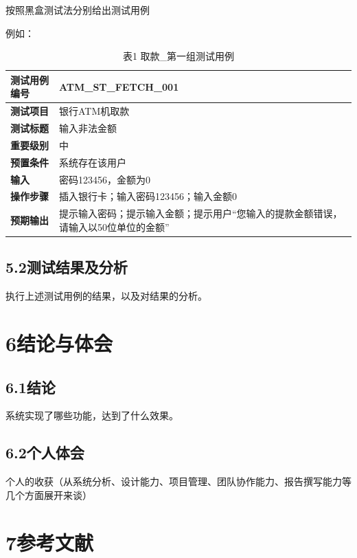 \documentclass[12pt,a4paper,oneside]{ctexart}
\begin{document}
\par 按照黑盒测试法分别给出测试用例
\par 例如：
\begin{table}[htbp]
\centering
\caption{表1 取款\_第一组测试用例}
\label{表1取款_第一组测}
\begin{tabular}{|p{3cm}|p{8cm}|}
\hline
  \textbf{测试用例编号} & ATM\_ST\_FETCH\_001 \\
  \hline
  \textbf{测试项目} & 银行ATM机取款 \\
  \hline
  \textbf{测试标题} & 输入非法金额 \\
  \hline
  \textbf{重要级别} & 中 \\
  \hline
  \textbf{预置条件} & 系统存在该用户 \\
  \hline
  \textbf{输入} & 密码123456，金额为0 \\
  \hline
  \textbf{操作步骤} & 插入银行卡；输入密码123456；输入金额0 \\
  \hline
  \textbf{预期输出} & 提示输入密码；提示输入金额；提示用户“您输入的提款金额错误，请输入以50位单位的金额” \\
  \hline
\end{tabular}
\end{table}

\subsection{5.2测试结果及分析}

\par 执行上述测试用例的结果，以及对结果的分析。
\section{6结论与体会}

\subsection{6.1结论}

\par 系统实现了哪些功能，达到了什么效果。
\subsection{6.2个人体会}

\par 个人的收获（从系统分析、设计能力、项目管理、团队协作能力、报告撰写能力等几个方面展开来谈）
\section{7参考文献}
\end{document}

